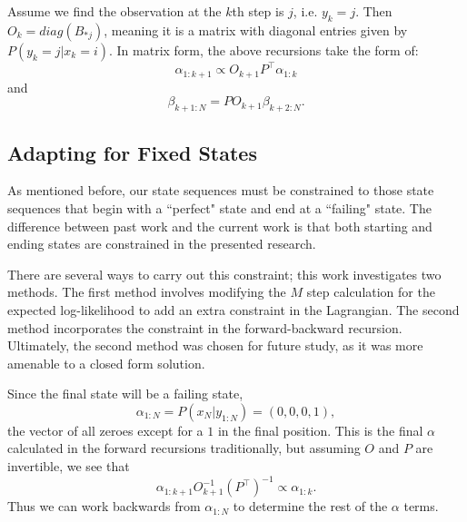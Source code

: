 \documentclass[english]{article}
\numberwithin{equation}{section}
\DeclarePairedDelimiter\paren{(}{)}           %
\begin{document}
	Assume we find the observation at the $k$th step is $j$, i.e. $y_k=j$. Then $O_{k} = diag(B_{*j})$, meaning it is a matrix with diagonal entries given by $P(y_k=j|x_k=i)$. In matrix form, the above recursions take the form of:
	$$\alpha_{1:k+1} \propto O_{k+1}P^{\top} \alpha_{1:k}$$
	and
	$$\beta_{k+1:N}=PO_{k+1}\beta_{k+2:N}.$$
	
%	
%	
%	
%	
	
	\subsection*{Adapting for Fixed States}
	As mentioned before, our state sequences must be constrained to those state sequences that begin with a ``perfect" state and end at a ``failing" state. The difference between past work and the current work is that both starting and ending states are constrained in the presented research.
	
	There are several ways to carry out this constraint; this work investigates two methods. The first method involves modifying the $M$ step calculation for the expected log-likelihood to add an extra constraint in the Lagrangian. The second method incorporates the constraint in the forward-backward recursion. Ultimately, the second method was chosen for future study, as it was more amenable to a closed form solution.
	
	Since the final state will be a failing state, $$\alpha_{1:N}=P(x_N|y_{1:N})=(0,0,0,1),$$ the vector of all zeroes except for a $1$ in the final position. This is the final $\alpha$ calculated in the forward recursions traditionally, but assuming $O$ and $P$ are invertible,  we see that $$\alpha_{1:k+1}O_{k+1}^{-1}(P^{\top})^{-1} \propto \alpha_{1:k}.$$ Thus we can work backwards from $\alpha_{1:N}$ to determine the rest of the $\alpha$ terms.
	
\end{document}
